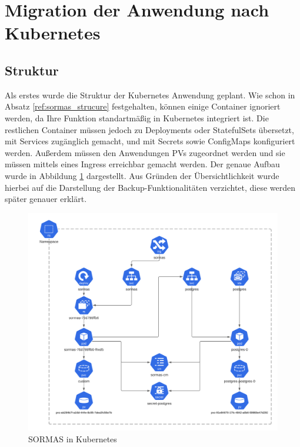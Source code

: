 \section{Migration der Anwendung nach Kubernetes}
\subsection{Struktur}
Als erstes wurde die Struktur der Kubernetes Anwendung geplant. 
Wie schon in Absatz \ref{ref:sormas_strucure} festgehalten, können einige Container ignoriert werden, da Ihre Funktion standartmäßig in Kubernetes integriert ist. 
Die restlichen Container müssen jedoch zu Deployments oder StatefulSets übersetzt, mit Services zugänglich gemacht, und mit Secrets sowie ConfigMaps konfiguriert werden. 
Außerdem müssen den Anwendungen \ac{PV}s zugeordnet werden und sie müssen mittels eines Ingress erreichbar gemacht werden.
Der genaue Aufbau wurde in Abbildung \ref{fig:sormas_kubernetes} dargestellt. 
Aus Gründen der Übersichtlichkeit wurde hierbei auf die Darstellung der Backup-Funktionalitäten verzichtet, diese werden später genauer erklärt.

\begin{figure}[h!]
\centering    
\includegraphics[width=\textwidth]{bilder/sormas_kubernetes.png}
\caption{SORMAS in Kubernetes}
\label{fig:sormas_kubernetes}
\end{figure}

